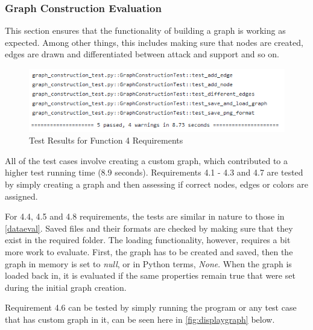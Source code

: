        \subsubsection{Graph Construction Evaluation} \label{grapheval}
            This section ensures that the functionality of building a graph is working as expected. Among other things, this includes making sure that nodes are created, edges are drawn and differentiated between attack and support and so on.
            
            \begin{figure}[!htbp]
                \centering
                \includegraphics[scale=0.9]{img/graph_construction_test.png}
                \caption{Test Results for Function 4 Requirements}
                \label{fig:testres4}
            \end{figure}
            \FloatBarrier
            
            All of the test cases involve creating a custom graph, which contributed to a higher test running time (8.9 seconds). Requirements 4.1 - 4.3 and 4.7 are tested by simply creating a graph and then assessing if correct nodes, edges or colors are assigned.
            
            For 4.4, 4.5 and 4.8 requirements, the tests are similar in nature to those in \cref{dataeval}. Saved files and their formats are checked by making sure that they exist in the required folder. The loading functionality, however, requires a bit more work to evaluate. First, the graph has to be created and saved, then the graph in memory is set to \textit{null}, or in Python terms, \textit{None}. When the graph is loaded back in, it is evaluated if the same properties remain true that were set during the initial graph creation.
            
            Requirement 4.6 can be tested by simply running the program or any test case that has custom graph in it, can be seen here in \cref{fig:displaygraph} below.
            

